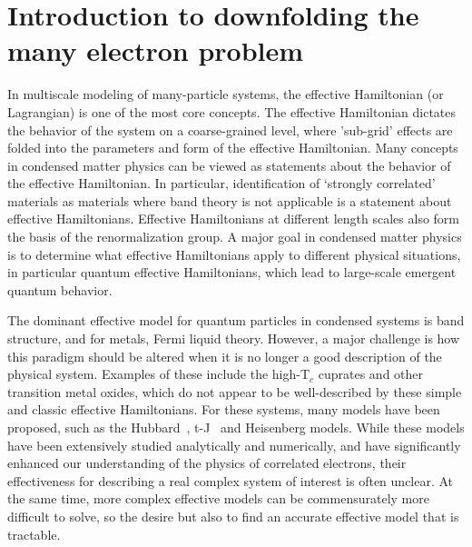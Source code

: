 \section{Introduction to downfolding the many electron problem}

In multiscale modeling of many-particle systems, the effective Hamiltonian (or Lagrangian) is one of the most core concepts. 
The effective Hamiltonian dictates the behavior of the system on a coarse-grained level, where 'sub-grid' effects are folded into the parameters and form of the effective Hamiltonian. 
Many concepts in condensed matter physics can be viewed as statements about the behavior of the effective Hamiltonian. 
In particular, identification of `strongly correlated' materials as materials where band theory is not applicable is a statement about effective Hamiltonians.
Effective Hamiltonians at different length scales also form the basis of the renormalization group\cite{Wilson}.
A major goal in condensed matter physics is to determine what effective Hamiltonians apply to different physical situations, in particular quantum effective Hamiltonians, which lead to large-scale emergent quantum behavior. 

The dominant effective model for quantum particles in condensed systems is band structure, and for metals, Fermi liquid theory. 
However, a major challenge is how this paradigm should be altered when it is no longer a good description of the physical system.
Examples of these include the high-T$_c$ cuprates and other transition metal oxides, which do not appear to be well-described by these simple and classic effective Hamiltonians. 
For these systems, many models have been proposed, such as the Hubbard~\cite{Hubbard1963}, t-J~\cite{tJSpalek} and Heisenberg models.
While these models have been extensively studied analytically and numerically, and have significantly enhanced our understanding of the physics of correlated electrons, their effectiveness for describing a real complex system of interest is often unclear. 
At the same time, more complex effective models can be commensurately more difficult to solve, so the desire but also to find an accurate effective model that is tractable. 



